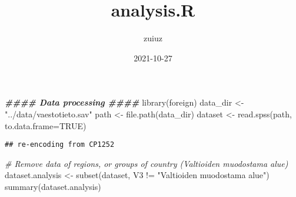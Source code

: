 \documentclass[
]{article}
\title{analysis.R}
\author{zuiuz}
\date{2021-10-27}
\newenvironment{Shaded}{\begin{snugshade}}{\end{snugshade}}
\newcommand{\AttributeTok}[1]{\textcolor[rgb]{0.77,0.63,0.00}{#1}}
\newcommand{\CommentTok}[1]{\textcolor[rgb]{0.56,0.35,0.01}{\textit{#1}}}
\newcommand{\ConstantTok}[1]{\textcolor[rgb]{0.00,0.00,0.00}{#1}}
\newcommand{\DocumentationTok}[1]{\textcolor[rgb]{0.56,0.35,0.01}{\textbf{\textit{#1}}}}
\newcommand{\FunctionTok}[1]{\textcolor[rgb]{0.00,0.00,0.00}{#1}}
\newcommand{\NormalTok}[1]{#1}
\newcommand{\OtherTok}[1]{\textcolor[rgb]{0.56,0.35,0.01}{#1}}
\newcommand{\SpecialCharTok}[1]{\textcolor[rgb]{0.00,0.00,0.00}{#1}}
\newcommand{\StringTok}[1]{\textcolor[rgb]{0.31,0.60,0.02}{#1}}
\begin{document}
\maketitle

\begin{Shaded}
\begin{Highlighting}[]
\DocumentationTok{\#\#\#\# Data processing \#\#\#\#}
\FunctionTok{library}\NormalTok{(foreign)}
\NormalTok{data\_dir }\OtherTok{\textless{}{-}} \StringTok{"../data/vaestotieto.sav"}
\NormalTok{path }\OtherTok{\textless{}{-}} \FunctionTok{file.path}\NormalTok{(data\_dir)}
\NormalTok{dataset }\OtherTok{\textless{}{-}} \FunctionTok{read.spss}\NormalTok{(path, }\AttributeTok{to.data.frame=}\ConstantTok{TRUE}\NormalTok{)}
\end{Highlighting}
\end{Shaded}

\begin{verbatim}
## re-encoding from CP1252
\end{verbatim}

\begin{Shaded}
\begin{Highlighting}[]
\CommentTok{\# Remove data of regions, or groups of country (Valtioiden muodostama alue)  }
\NormalTok{dataset.analysis }\OtherTok{\textless{}{-}} \FunctionTok{subset}\NormalTok{(dataset, V3 }\SpecialCharTok{!=} \StringTok{"Valtioiden muodostama alue"}\NormalTok{)}
\FunctionTok{summary}\NormalTok{(dataset.analysis)}
\end{Highlighting}
\end{Shaded}
\end{document}
